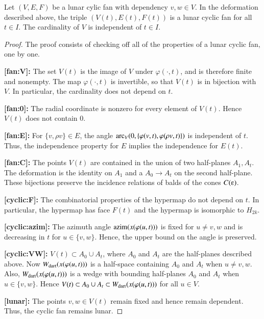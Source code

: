 \begin{lemma} Let $(V,E,F)$ be a lunar cylic fan with dependency $v,w\in V$.  In the deformation described above, the triple $(V(t),E(t),F(t))$ is a lunar cyclic fan for all $t\in I$.  The cardinality of $V$ is independent of $t\in I$.
\end{lemma}

\begin{proof}  The proof consists of checking off all of the properties of a lunar cyclic fan, one by one.  

{\bf [fan:V]:} The set $V(t)$ is the image of $V$ under $\varphi(\cdot,t)$, and is therefore finite and nonempty.  The map $\varphi(\cdot,t)$ is invertible, so that $V(t)$ is in bijection with $V$.  In particular, the cardinality does not depend on $t$.

{\bf [fan:0]:} The radial coordinate is nonzero for every element of $V(t)$.  Hence $V(t)$ does not contain $0$.

{\bf [fan:E]:} For $\{v,\rho v\}\in E$, the angle 
${\operatorname{arc}}_V(0,\{\varphi(v,t),\varphi(\rho v,t)\})$
is independent of $t$.  Thus, the independence property for $E$ implies
the independence for $E(t)$.

{\bf [fan:C]:} The points $V(t)$ are contained in the union of two half-planes $A_1,A_t$.  The deformation is the identity on $A_1$ and a $A_0\to A_t$ on the second half-plane.  These bijections preserve the incidence relations of balds of the cones $C(\e)$.  

{\bf [cyclic:F]:} The combinatorial properties of the hypermap do not depend on $t$.  In particular, the hypermap has face $F(t)$ and the hypermap is isomorphic to $H_{2k}$.

{\bf [cyclic:azim]:} The azimuth angle ${\operatorname{azim}}(x(\varphi(u,t)))$ is fixed for $u\ne v,w$ and is decreasing in $t$ for $u\in \{v,w\}$.  Hence, the upper bound on the angle is preserved.

{\bf [cyclic:VW]:} $V(t)\subset A_0\cup A_t$, where $A_0$ and $A_t$ are the
half-planes described above.  Now $W_{\text{dart}}(x(\varphi(u,t)))$ is a half-space containing $A_0$ and $A_t$ when $u\ne v,w$.  Also, $W_{\text{dart}}(x(\varphi(u,t)))$ is a wedge with bounding half-planes $A_0$ and $A_t$ when $u\in \{v,w\}$.  Hence
$V(t)\subset A_0\cup A_t\subset W_{\text{dart}}(x(\varphi(u,t)))$ for all $u\in V$.

{\bf [lunar]:} The points $v,w\in V(t)$ remain fixed and hence remain dependent.  Thus, the cyclic fan remains lunar.  
\end{proof}

